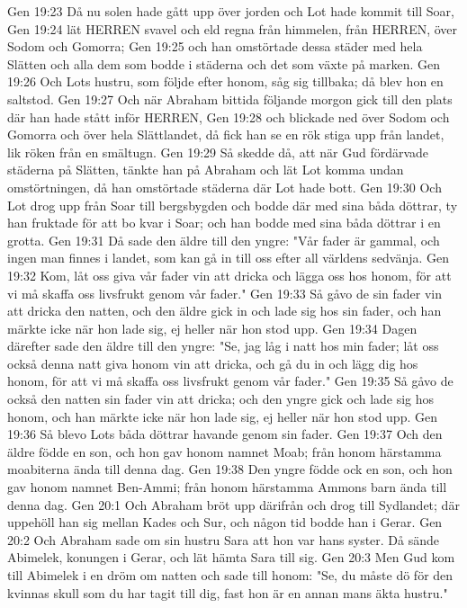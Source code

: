 Gen 19:23  Då nu solen hade gått upp över jorden och Lot hade kommit till Soar,
Gen 19:24  lät HERREN svavel och eld regna från himmelen, från HERREN, över Sodom och Gomorra;
Gen 19:25  och han omstörtade dessa städer med hela Slätten och alla dem som bodde i städerna och det som växte på marken.
Gen 19:26  Och Lots hustru, som följde efter honom, såg sig tillbaka; då blev hon en saltstod.
Gen 19:27  Och när Abraham bittida följande morgon gick till den plats där han hade stått inför HERREN,
Gen 19:28  och blickade ned över Sodom och Gomorra och över hela Slättlandet, då fick han se en rök stiga upp från landet, lik röken från en smältugn.
Gen 19:29  Så skedde då, att när Gud fördärvade städerna på Slätten, tänkte han på Abraham och lät Lot komma undan omstörtningen, då han omstörtade städerna där Lot hade bott.
Gen 19:30  Och Lot drog upp från Soar till bergsbygden och bodde där med sina båda döttrar, ty han fruktade för att bo kvar i Soar; och han bodde med sina båda döttrar i en grotta.
Gen 19:31  Då sade den äldre till den yngre: "Vår fader är gammal, och ingen man finnes i landet, som kan gå in till oss efter all världens sedvänja.
Gen 19:32  Kom, låt oss giva vår fader vin att dricka och lägga oss hos honom, för att vi må skaffa oss livsfrukt genom vår fader."
Gen 19:33  Så gåvo de sin fader vin att dricka den natten, och den äldre gick in och lade sig hos sin fader, och han märkte icke när hon lade sig, ej heller när hon stod upp.
Gen 19:34  Dagen därefter sade den äldre till den yngre: "Se, jag låg i natt hos min fader; låt oss också denna natt giva honom vin att dricka, och gå du in och lägg dig hos honom, för att vi må skaffa oss livsfrukt genom vår fader."
Gen 19:35  Så gåvo de också den natten sin fader vin att dricka; och den yngre gick och lade sig hos honom, och han märkte icke när hon lade sig, ej heller när hon stod upp.
Gen 19:36  Så blevo Lots båda döttrar havande genom sin fader.
Gen 19:37  Och den äldre födde en son, och hon gav honom namnet Moab; från honom härstamma moabiterna ända till denna dag.
Gen 19:38  Den yngre födde ock en son, och hon gav honom namnet Ben-Ammi; från honom härstamma Ammons barn ända till denna dag.
Gen 20:1  Och Abraham bröt upp därifrån och drog till Sydlandet; där uppehöll han sig mellan Kades och Sur, och någon tid bodde han i Gerar.
Gen 20:2  Och Abraham sade om sin hustru Sara att hon var hans syster. Då sände Abimelek, konungen i Gerar, och lät hämta Sara till sig.
Gen 20:3  Men Gud kom till Abimelek i en dröm om natten och sade till honom: "Se, du måste dö för den kvinnas skull som du har tagit till dig, fast hon är en annan mans äkta hustru."
